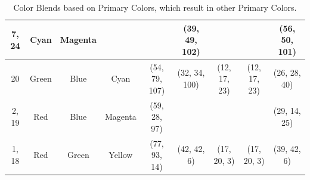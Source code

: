 \begin{table}[htbp]
{\begin{tabular}{ccccclclclclcl}
    \multicolumn{1}{c|}{7, 24}    & \multicolumn{1}{c|}{Cyan}    & \multicolumn{1}{c||}{Magenta} & \multicolumn{1}{c||}{\cellcolor[HTML]{0000FF}{\color[HTML]{FFFFFF} Blue}} & \multicolumn{2}{c||}{\cellcolor[HTML]{0000FF}{\color[HTML]{FFFFFF} (18, 7, 95)}} & \multicolumn{2}{c||}{\cellcolor[HTML]{00CAFF}(39, 49, 102)}                       & \multicolumn{2}{c||}{\cellcolor[HTML]{8080FF}{\color[HTML]{FFFFFF} (35, 27, 98)}} & \multicolumn{2}{c||}{\cellcolor[HTML]{8080FF}{\color[HTML]{FFFFFF} (35, 27, 98)}} & \multicolumn{2}{c|}{\cellcolor[HTML]{C6AEFF}(56, 50, 101)} \\ \hline \hline
    \multicolumn{1}{c|}{20}       & \multicolumn{1}{c|}{Green}   & \multicolumn{1}{c||}{Blue}    & \multicolumn{1}{c||}{\cellcolor[HTML]{00FFFF}Cyan}                        & \multicolumn{2}{c||}{\cellcolor[HTML]{00FFFF}(54, 79, 107)}                      & \multicolumn{2}{c||}{\cellcolor[HTML]{00A5FF}(32, 34, 100)}                       & \multicolumn{2}{c||}{\cellcolor[HTML]{008080}(12, 17, 23)}                        & \multicolumn{2}{c||}{\cellcolor[HTML]{008080}(12, 17, 23)}                        & \multicolumn{2}{c|}{\cellcolor[HTML]{7D93A6}(26, 28, 40)}  \\ \hline \hline
    \multicolumn{1}{c|}{2, 19}    & \multicolumn{1}{c|}{Red}     & \multicolumn{1}{c||}{Blue}    & \multicolumn{1}{c||}{\cellcolor[HTML]{FF00FF}Magenta}                     & \multicolumn{2}{c||}{\cellcolor[HTML]{FF00FF}(59, 28, 97)}                       & \multicolumn{2}{c||}{\cellcolor[HTML]{FB0080}{\color[HTML]{FFFFFF} (44, 22, 22)}} & \multicolumn{2}{c||}{\cellcolor[HTML]{800080}{\color[HTML]{FFFFFF} (13, 6, 21)}}  & \multicolumn{2}{c||}{\cellcolor[HTML]{800080}{\color[HTML]{FFFFFF} (13, 6, 21)}}  & \multicolumn{2}{c|}{\cellcolor[HTML]{CA0088}(29, 14, 25)}  \\ \hline \hline
    \multicolumn{1}{c|}{1, 18}    & \multicolumn{1}{c|}{Red}     & \multicolumn{1}{c||}{Green}   & \multicolumn{1}{c||}{\cellcolor[HTML]{FFFF00}Yellow}                      & \multicolumn{2}{c||}{\cellcolor[HTML]{FFFF00}(77, 93, 14)}                       & \multicolumn{2}{c||}{\cellcolor[HTML]{D7A700}(42, 42, 6)}                         & \multicolumn{2}{c||}{\cellcolor[HTML]{808000}(17, 20, 3)}                         & \multicolumn{2}{c||}{\cellcolor[HTML]{808000}(17, 20, 3)}                         & \multicolumn{2}{c|}{\cellcolor[HTML]{C9AB00}(39, 42, 6)}   \\ \hline
  \end{tabular}}
  \caption[Color Blends based on Primary Colors, which result in other Primary Colors.]{Color Blends based on Primary Colors, which result in other Primary Colors.}
  \label{table:primary_blends}
\end{table}
